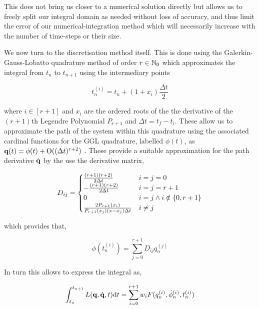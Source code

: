 \documentclass[10pt]{iopart}
\begin{document}
This does not bring us closer to a numerical solution directly but allows us to freely split our integral domain as needed without loss of accuracy, and thus limit the error of our numerical-integration method which will necessarily increase with the number of time-steps or their size.

We now turn to the discretisation method itself. This is done using the Galerkin-Gauss-Lobatto quadrature method of order $r \in \mathbb{N}_0$\cite{tsangSLIMPLECTICINTEGRATORSVARIATIONAL2015} which approximates the integral from $t_n$ to $t_{n + 1}$ using the intermediary points

\begin{equation}
  t^{(i)}_n = t_n + (1 + x_i)\frac{\Delta t}{2}
\end{equation}

where $i \in [r + 1]$ and $x_i$ are the ordered roots of the the derivative of the $(r + 1)$th Legendre Polynomial $P_{r + 1}$ and $\Delta t = t_f - t_i$. These allow us to approximate the path of the system within this quadrature using the associated cardinal functions for the GGL quadrature, labelled $\phi(t)$, as \(\vb q(t) = \phi(t) + \mathord{\mathrm{O}}((\Delta t)^{r + 2})\) . These provide a suitable approximation for the path derivative $\dot{\vb q}$ by the use the derivative matrix,

\begin{equation}
  D_{ij} = \begin{cases}
  	\frac{(r + 1)(r + 2)}{2\Delta t} &i = j = 0 \\
  	-\frac{(r + 1)(r + 2)}{2\Delta t} & i = j = r + 1 \\
  	0 & i = j \land i \notin \left\{0, r + 1\right\} \\
  	\frac{2P_{r + 1}(x_i)}{P_{r+1}(x_j)(x - x_j)\Delta t} & i\neq j
  \end{cases}
\end{equation}

which provides that,

\begin{equation}
  \dot\phi(t_n^{(i)}) = \sum_{j = 0}^{r + 1} D_{ij}q_n^{(j)}
\end{equation}

In turn this allows to express the integral as,

\begin{equation}
  \int_{t_n}^{t_{n + 1}} L(\vb q, \dot{\vb q}, t) \dd t = \sum_{i = 0}^{r + 1} w_i F(q_{n}^{(i)}, \dot\phi_{n}^{(i)}, t_{n}^{(i)})
\end{equation}
\end{document}
